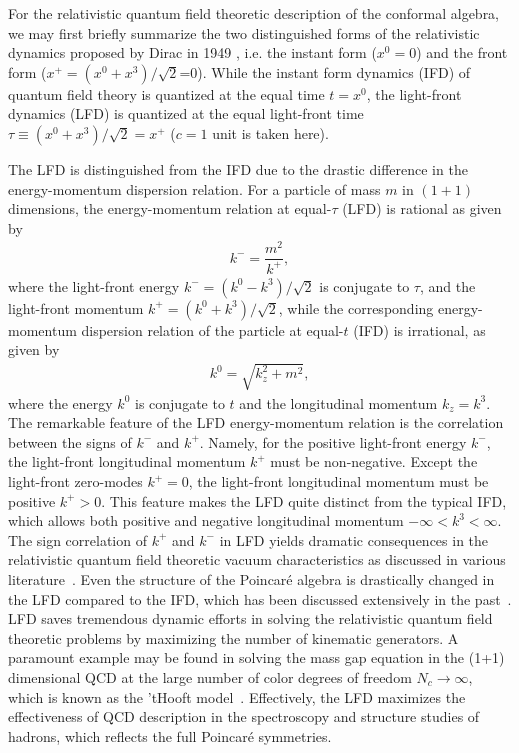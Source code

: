 \documentclass[%
 reprint,
superscriptaddress,
 amsmath,amssymb,
 aps,
]{revtex4-2}
\begin{document}
For the relativistic quantum field theoretic description of the conformal algebra, we may first briefly summarize the two distinguished forms of the relativistic dynamics proposed by Dirac  
in 1949 \cite{Dirac1949}, i.e. the instant form ($x^{0}=0$) and the front form ($x^{+}=(x^{0}+x^{3})/\sqrt{2}$=0). 
While the instant form dynamics (IFD) of quantum field theory is quantized at the equal time $t=x^{0}$, the light-front dynamics (LFD) is quantized at the equal light-front time $\tau \equiv (x^{0}+x^{3})/\sqrt{2}=x^{+}$ ($c=1$ unit is taken here).

The LFD is distinguished from the IFD due to 
the drastic difference in the energy-momentum dispersion relation. For a particle of mass $m$ in $(1+1)$ dimensions, the energy-momentum relation at equal-$\tau$ (LFD) is rational as given by
\begin{align}
  k^{-}=\dfrac{m^{2}}{k^{+}}, \label{eqn:E-P_relation_LF}
\end{align}
where the light-front energy $k^{-}=(k^{0}-k^{3})/\sqrt{2}$ is conjugate to $\tau$, and the light-front momentum $k^{+}=(k^{0}+k^{3})/\sqrt{2}$,
while the corresponding energy-momentum dispersion relation of the particle at equal-$t$ (IFD) is irrational, as given by
\begin{align}
  k^{0}=\sqrt{k_z^{2}+m^{2}}, \label{eqn:E-P_relation_IF}
\end{align}
where the energy $k^{0}$ is conjugate to $t$ and the longitudinal momentum $k_z = k^{3}$. 
The remarkable feature of the LFD energy-momentum relation is the correlation between the signs of $k^{-}$ and $k^{+}$. Namely, for the positive light-front energy $k^{-}$, the light-front longitudinal momentum $k^{+}$ must be non-negative.
Except the light-front zero-modes $k^{+}=0$, the light-front longitudinal momentum must be positive $k^{+}>0$. This feature makes the LFD quite distinct from the typical IFD, which allows both positive and negative longitudinal momentum $-\infty < k^3 < \infty$. The sign correlation of $k^+$ and $k^-$ in LFD yields dramatic consequences in the relativistic quantum field theoretic vacuum characteristics as discussed in various literature~\cite{Brodsky_1998, BrodskyLightFrontMethodsandNonPerturbativeQCD, harindranath1998introductionlightfrontdynamicspedestrians, ji2023relativistic}. 
Even the structure of the Poincar\'e algebra is drastically changed in the LFD compared to the IFD, which has been discussed extensively in the past~\cite{Ji2001}.
LFD saves tremendous dynamic efforts in solving the relativistic quantum field theoretic problems by maximizing the number of kinematic generators. 
A paramount example may be found in solving the mass gap equation in the (1+1) dimensional QCD at the large number of color degrees of freedom $N_c \to \infty$, which is known as the 'tHooft model~\cite{THOOFT1974461, Ji2021QCD, ji2023relativistic}. Effectively, the LFD maximizes the effectiveness of QCD description in the spectroscopy and structure studies of hadrons, which reflects the full Poincar\'e symmetries.
\end{document}
